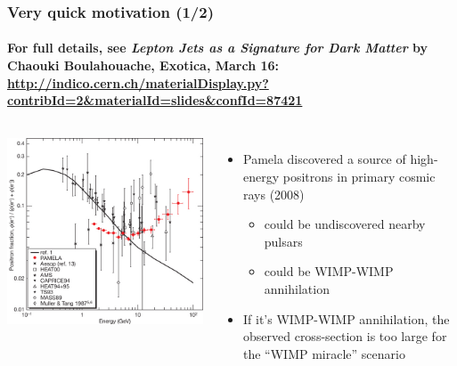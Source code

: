 \documentclass[compress]{beamer}
\begin{document}
\begin{frame}
\frametitle{Very quick motivation (1/2)}
\framesubtitle{For full details, see {\it Lepton Jets as a Signature for Dark Matter} by \\ Chaouki Boulahouache, Exotica, March 16: \href{http://indico.cern.ch/materialDisplay.py?contribId=2&materialId=slides&confId=87421}{http://indico.cern.ch/materialDisplay.py?contribId=2\&materialId=slides\&confId=87421}}

\begin{columns}
\includegraphics[width=\linewidth]{nature07942-f22jpg.jpeg}
\begin{itemize}
\item Pamela discovered a source of high-energy positrons in primary cosmic rays (2008)
\begin{itemize}
\item could be undiscovered nearby pulsars
\item could be WIMP-WIMP annihilation
\end{itemize}

\item If it's WIMP-WIMP annihilation, the observed cross-section is too large for the ``WIMP miracle'' scenario
\end{itemize}
\end{columns}


\end{frame}
\end{document}
